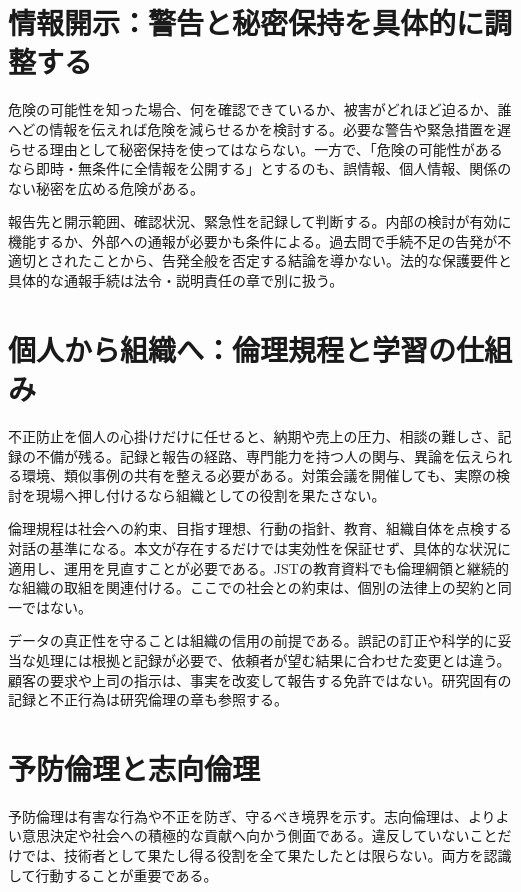 \section{情報開示：警告と秘密保持を具体的に調整する}
\label{theory:ethics:disclosure}
危険の可能性を知った場合、何を確認できているか、被害がどれほど迫るか、誰へどの情報を伝えれば危険を減らせるかを検討する。必要な警告や緊急措置を遅らせる理由として秘密保持を使ってはならない。一方で、「危険の可能性があるなら即時・無条件に全情報を公開する」とするのも、誤情報、個人情報、関係のない秘密を広める危険がある。

報告先と開示範囲、確認状況、緊急性を記録して判断する。内部の検討が有効に機能するか、外部への通報が必要かも条件による。過去問で手続不足の告発が不適切とされたことから、告発全般を否定する結論を導かない。法的な保護要件と具体的な通報手続は法令・説明責任の章で別に扱う。

\section{個人から組織へ：倫理規程と学習の仕組み}
\label{theory:ethics:organization}
不正防止を個人の心掛けだけに任せると、納期や売上の圧力、相談の難しさ、記録の不備が残る。記録と報告の経路、専門能力を持つ人の関与、異論を伝えられる環境、類似事例の共有を整える必要がある。対策会議を開催しても、実際の検討を現場へ押し付けるなら組織としての役割を果たさない。

倫理規程は社会への約束、目指す理想、行動の指針、教育、組織自体を点検する対話の基準になる。本文が存在するだけでは実効性を保証せず、具体的な状況に適用し、運用を見直すことが必要である。JSTの教育資料でも倫理綱領と継続的な組織の取組を関連付ける\parencite{fudano_ethics2021}。ここでの社会との約束は、個別の法律上の契約と同一ではない。

データの真正性を守ることは組織の信用の前提である。誤記の訂正や科学的に妥当な処理には根拠と記録が必要で、依頼者が望む結果に合わせた変更とは違う。顧客の要求や上司の指示は、事実を改変して報告する免許ではない。研究固有の記録と不正行為は研究倫理の章も参照する。

\section{予防倫理と志向倫理}
\label{theory:ethics:aspiration}
予防倫理は有害な行為や不正を防ぎ、守るべき境界を示す。志向倫理は、よりよい意思決定や社会への積極的な貢献へ向かう側面である。違反していないことだけでは、技術者として果たし得る役割を全て果たしたとは限らない。両方を認識して行動することが重要である\parencite{fudano_ethics2021}。

